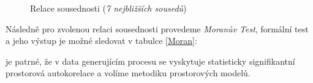\documentclass[11pt, a4paper]{article}
\begin{document}
 \begin{figure}[ht]
 \label{}
    \centering
        \noindent{}
    \caption{Relace sousednosti (\textit{7 nejbližších sousedů})}
    \label{Relace sousednosti}
\end{figure}

Následně pro zvolenou relaci sousednosti provedeme \textit{Moranův Test}, formální test a jeho výstup je možné sledovat v tabulce \ref{Moran}:
\clearpage

\begin{table}[!htbp] \centering 
  \caption{Moranův Test 7-NN} 
  \label{Moran} 
\end{table} 

je patrné, že v data generujícím procesu se vyskytuje statisticky signifikantní prostorová autokorelace a volíme metodiku prostorových modelů. 
\end{document}
